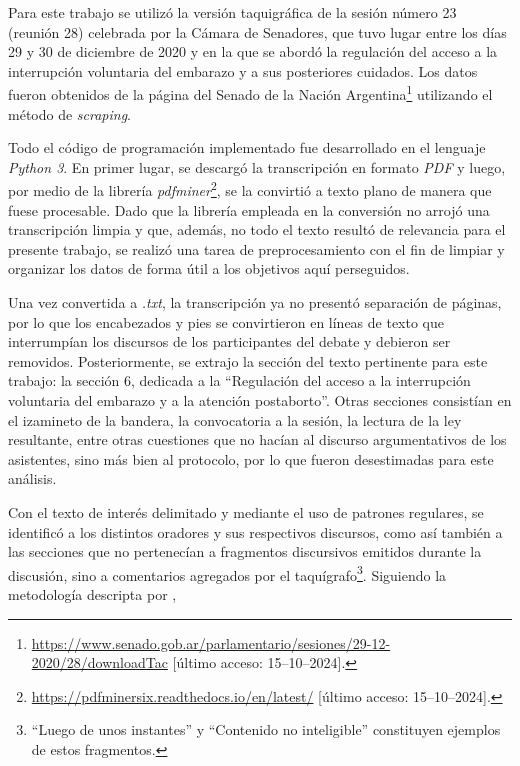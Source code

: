 Para este trabajo se utiliz\'o la versi\'on {taquigr\'afica} de la sesi\'on n\'umero
23 (reuni\'on 28) celebrada por la {C\'amara} de Senadores, que tuvo lugar entre los d\'ias
29 y 30 de diciembre de 2020 y en la que se abord\'o la
regulaci\'on del acceso a la interrupci\'on voluntaria del embarazo y a sus
posteriores cuidados. Los datos fueron obtenidos de la {p\'agina} del Senado de la Naci\'on
Argentina\footnote{\url{https://www.senado.gob.ar/parlamentario/sesiones/29-12-2020/28/downloadTac}
[\'ultimo acceso: 15--10--2024].}
utilizando el m\'etodo de \textit{scraping}.\par
Todo el c\'odigo de programaci\'on implementado fue desarrollado en el lenguaje
\textit{Python 3}. En primer lugar, se descarg\'o la transcripci\'on en formato \textit{PDF} y luego, por
medio de la librer\'ia \textit{pdfminer}\footnote{\url{https://pdfminersix.readthedocs.io/en/latest/}
[\'ultimo acceso: 15--10--2024].},
se la convirti\'o a texto plano de manera que fuese procesable. Dado que la librer\'ia
empleada en la conversi\'on no arroj\'o una transcripci\'on limpia y que, {adem\'as}, no todo el texto
result\'o de relevancia para el presente trabajo, se {realiz\'o} una tarea de
preprocesamiento con el fin de limpiar y organizar los datos de forma \'util a los
objetivos aqu\'i perseguidos.\par
Una vez convertida a \textit{.txt}, la transcripci\'on ya no present\'o separaci\'on de
{p\'aginas}, por lo que los encabezados y pies se convirtieron en l\'ineas de texto que
interrump\'ian los discursos de los participantes del debate y debieron
ser removidos.
Posteriormente, se extrajo la secci\'on del texto pertinente para este trabajo:
la secci\'on 6, dedicada a la ``Regulaci\'on  del  acceso  a  la  interrupci\'on
voluntaria  del  embarazo  y  a  la atenci\'on postaborto''. Otras secciones consist\'ian
en el izamineto de la bandera, la convocatoria a la sesi\'on, la lectura de la ley
resultante, entre otras cuestiones que no hac\'ian al discurso argumentativos de los
asistentes, sino {m\'as} bien al protocolo, por lo que fueron desestimadas
para este {an\'alisis}.\par
Con el texto de inter\'es delimitado y mediante el uso de patrones regulares, se
identific\'o a los distintos oradores y sus respectivos discursos, como as\'i tambi\'en
a las secciones que no pertenec\'ian a fragmentos discursivos emitidos durante la
discusi\'on, sino a comentarios agregados por el taqu\'igrafo\footnote{``Luego de unos
instantes'' y ``Contenido no inteligible'' constituyen ejemplos de estos
fragmentos.}. Siguiendo la metodolog\'ia descripta por \cite{monroe2008fightin},
